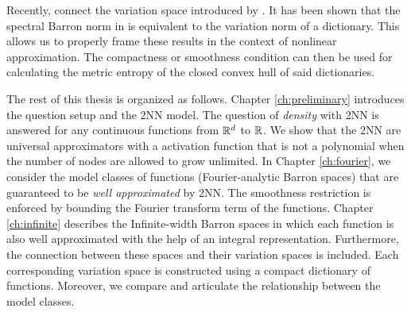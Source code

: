 Recently, \cite{siegelCharacterizationVariationSpaces2022} connect the variation
space introduced by \cite{parhiBanachSpaceRepresenter2021,
parhiWhatKindsFunctions2022}. It has been shown that the spectral Barron norm in
is equivalent to the variation norm of a dictionary. This allows us to properly
frame these results in the context of nonlinear approximation. The compactness
or smoothness condition can then be used for calculating the metric entropy of
the closed convex hull of said dictionaries.




The rest of this thesis is organized as follows. Chapter \ref{ch:preliminary}
introduces the question setup and the 2NN model. The question of
\textit{density} with 2NN is answered for any continuous functions from $\mathbb{R}^d$
to $\mathbb{R}$. We show that the 2NN are universal approximators with a activation
function that is not a polynomial when the number of nodes are allowed to grow
unlimited. In Chapter \ref{ch:fourier}, we consider the model classes of
functions (Fourier-analytic Barron spaces) that are guaranteed to be
\textit{well approximated} by 2NN. The smoothness restriction is enforced by
bounding the Fourier transform term of the functions. Chapter \ref{ch:infinite}
describes the Infinite-width Barron spaces in which each function is also well
approximated with the help of an integral representation. Furthermore, the
connection between these spaces and their variation spaces is included. Each
corresponding variation space is constructed using a compact dictionary of
functions. Moreover, we compare and articulate the relationship between the
model classes.

